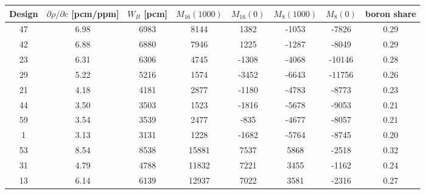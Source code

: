\begin{tabular}{cccccccc}
\toprule
Design & $\partial\rho/\partial c$ [pcm/ppm] & $W_B$ [pcm] & $M_{16}(1000)$ & $M_{16}(0)$ & $M_{8}(1000)$ & $M_{8}(0)$ & boron share \\
\midrule
    47 & 6.98 & 6983 & 8144 & 1382 & -1053 & -7826 & 0.29 \\
    42 & 6.88 & 6880 & 7946 & 1225 & -1287 & -8049 & 0.29 \\
    23 & 6.31 & 6306 & 4745 & -1308 & -4068 & -10146 & 0.28 \\
    29 & 5.22 & 5216 & 1574 & -3452 & -6643 & -11756 & 0.26 \\
    21 & 4.18 & 4181 & 2877 & -1180 & -4783 & -8773 & 0.23 \\
    44 & 3.50 & 3503 & 1523 & -1816 & -5678 & -9053 & 0.21 \\
    59 & 3.54 & 3539 & 2477 & -835 & -4677 & -8057 & 0.21 \\
    1 & 3.13 & 3131 & 1228 & -1682 & -5764 & -8745 & 0.20 \\
    53 & 8.54 & 8538 & 15881 & 7537 & 5868 & -2518 & 0.32 \\
    31 & 4.79 & 4788 & 11832 & 7221 & 3455 & -1162 & 0.24 \\
    13 & 6.14 & 6139 & 12937 & 7022 & 3581 & -2316 & 0.27 \\
\bottomrule
\end{tabular}
